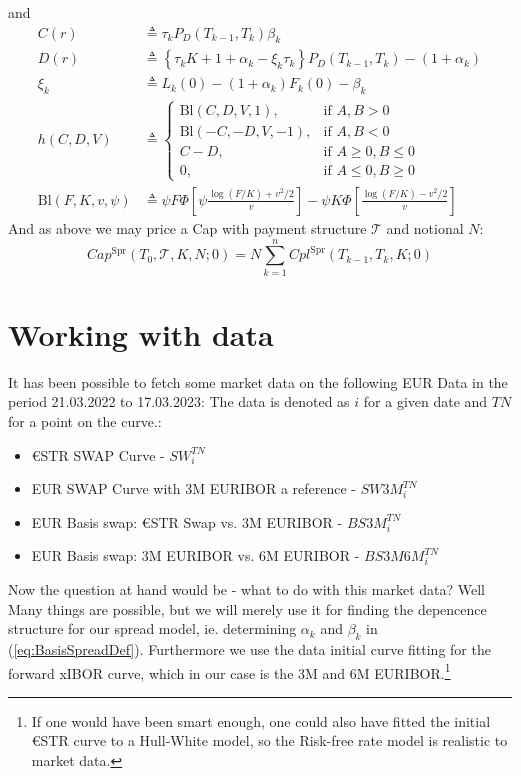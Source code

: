 \documentclass[12pt]{article}
\begin{document}
and
\begin{equation}
    \begin{aligned}
        C(r) & \triangleq
        \tau_k P_D \left( T_{k-1} , T_k \right)
        \beta_k \\
        D(r) & \triangleq
        \left\{ \tau_k K + 1 + \alpha_k - \xi_k \tau_k \right\}
        P_D \left( T_{k-1},T_k \right)
        - (1+ \alpha_k) \\
        \xi_k &\triangleq
        L_k(0) - (1+\alpha_k)F_k(0) - \beta_k \\
        h(C,D,V) & \triangleq
        \begin{cases}
            \text{Bl}(C,D,V , 1), & \text{if }A,B > 0 \\
            \text{Bl}(-C,-D,V , -1), & \text{if }A,B < 0 \\
            C - D, & \text{if }A \geq 0, B \leq 0 \\
            0 , & \text{if }A \leq 0, B \geq 0
        \end{cases} \\
        \text{Bl}(F,K,v,\psi) & \triangleq
        \psi F \Phi \left[\psi\frac{\log \left( F/K \right)
        + v ^2 /2 }{v}\right]- \psi K \Phi
        \left[\frac{\log \left( F/K \right)
        - v ^2 /2 }{v}\right]
    \end{aligned}
\end{equation}
And as above we may price a Cap with payment structure
$\mathcal{T}$ and notional $N$:
\begin{equation}
    Cap ^{\text{Spr}}(T_0,\mathcal{T},K,N;0) =
    N \sum_{k=1}^n Cpl^{\text{Spr}}(T_{k-1},T_k , K ; 0)
\end{equation}
\section{Working with data}
It has been possible to fetch some market data on
the following EUR Data in the period 21.03.2022 to 17.03.2023:
The data is denoted as $i$ for a given date
and $TN$ for a point on the curve.:
\begin{itemize}
    \item €STR SWAP Curve - $SW_i^{TN}$
    \item EUR SWAP Curve with 3M EURIBOR a reference - $SW3M_i^{TN}$
    \item EUR Basis swap: €STR Swap vs. 3M EURIBOR -  $BS3M_i^{TN}$
    \item EUR Basis swap: 3M EURIBOR vs. 6M EURIBOR - $BS3M6M_i^{TN}$
\end{itemize}
Now the question at hand would be -
what to do with this market data? Well
Many things are possible, but we will merely use it for
finding the depencence structure for our spread model, ie.
determining $\alpha_k$ and $\beta_k$ in (\ref{eq:BasisSpreadDef}).
Furthermore we use the data initial curve
fitting for the forward xIBOR curve, which in our case
is the 3M and 6M EURIBOR.\footnote{If
one would have been smart enough, one could also have fitted the
initial €STR curve to a Hull-White model, so
the Risk-free rate model is realistic to market
data.}
\end{document}
